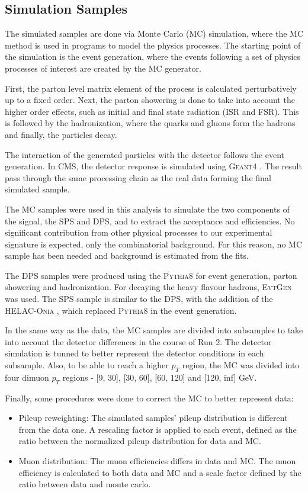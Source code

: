 \subsection{Simulation Samples}

The simulated samples are done via Monte Carlo (MC) simulation, where the MC method is used in programs to model the physics processes. The starting point of the simulation is the event generation, where the events following a set of physics processes of interest are created by the MC generator.

First, the parton level matrix element of the process is calculated perturbatively up to a fixed order. Next, the parton showering is done to take into account the higher order effects, such as initial and final state radiation (ISR and FSR). This is followed by the hadronization, where the quarks and gluons form the hadrons and finally, the particles decay.

The interaction of the generated particles with the detector follows the event generation. In CMS, the detector response is simulated using \textsc{Geant4} \cite{GEANT4:2002zbu}. The result pass through the same processing chain as the real data forming the final simulated sample.

The MC samples were used in this analysis to simulate the two components of the signal, the SPS and DPS, and to extract the acceptance and efficiencies. No significant contribution from other physical processes to our experimental signature is expected, only the combinatorial background. For this reason, no MC sample has been needed and background is estimated from the fits.

The DPS samples were produced using the \textsc{Pythia8} \cite{Sjostrand:2014zea} for event generation, parton showering and hadronization. For decaying the heavy flavour hadrons, \textsc{EvtGen} \cite{Lange:2001uf} was used. The SPS sample is similar to the DPS, with the addition of the \textsc{HELAC-Onia} \cite{Shao:2012iz, Shao:2015vga}, which replaced \textsc{Pythia8} in the event generation.

In the same way as the data, the MC samples are divided into subsamples to take into account the detector differences in the course of Run 2. The detector simulation is tunned to better represent the detector conditions in each subsample. Also, to be able to reach a higher $p_T$ region, the MC was divided into four dimuon $p_T$ regions - [9, 30], [30, 60], [60, 120] and [120, inf] GeV. 

Finally, some procedures were done to correct the MC to better represent data:
\begin{itemize}
  \item Pileup reweighting: The simulated samples' pileup distribution is different from the data one. A rescaling factor is applied to each event, defined as the ratio between the normalized pileup distribution for data and MC.
  \item Muon distribution: The muon efficiencies differs in data and MC. The muon efficiency is calculated to both data and MC and a scale factor defined by the ratio between data and monte carlo.
\end{itemize}

